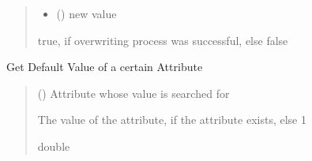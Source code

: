 \documentclass[letterpaper,10pt,english]{sphinxmanual}
\begin{document}
\begin{fulllineitems}
\begin{fulllineitems}
\begin{quote}
\begin{description}
\begin{itemize}
\item {} 
\sphinxAtStartPar
{} () \textendash{} new value

\end{itemize}

\sphinxAtStartPar
true, if overwriting process was successful, else false

\sphinxAtStartPar
{}

\end{description}\end{quote}

\end{fulllineitems}


\begin{fulllineitems}
\label{\detokenize{apidoc/src.osm_configurator.model.project.configuration:src.osm_configurator.model.project.configuration.default_value_list_entry.DefaultValueListEntry.get_attribute_default}}
\pysigstartsignatures
{}
\pysigstopsignatures
\sphinxAtStartPar
Get Default Value of a certain Attribute
\begin{quote}\begin{description}
\sphinxAtStartPar
\sphinxstyleliteralstrong{\sphinxupquote{(}}\sphinxstyleliteralstrong{\sphinxupquote{)}} () \textendash{} Attribute whose value is searched for

\sphinxAtStartPar
The value of the attribute, if the attribute exists, else \sphinxhyphen{}1

\sphinxAtStartPar
double

\end{description}\end{quote}

\end{fulllineitems}


\end{fulllineitems}
\end{document}
